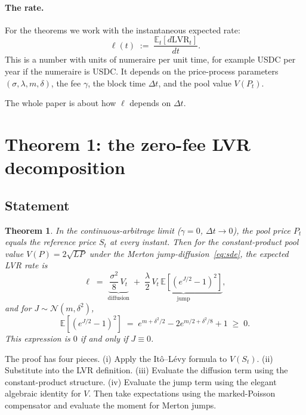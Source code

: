 \documentclass[11pt]{article}
\newtheorem{theorem}{Theorem}
\theoremstyle{definition}
\theoremstyle{remark}
\newcommand{\E}{\mathbb{E}}
\newcommand{\dt}{\Delta t}
\newcommand{\1}{\mathbf{1}}
\begin{document}
\paragraph{The rate.}
For the theorems we work with the instantaneous expected rate:
\begin{equation}\label{eq:rate}
\ell(t) \;:=\; \frac{\E_t[d\mathrm{LVR}_t]}{dt}.
\end{equation}
This is a number with units of numeraire per unit time, for example USDC per year if the numeraire is USDC. It depends on the price-process parameters $(\sigma, \lambda, m, \delta)$, the fee $\gamma$, the block time $\dt$, and the pool value $V(P_t)$.

The whole paper is about how $\ell$ depends on $\dt$.

\section{Theorem 1: the zero-fee LVR decomposition}\label{sec:thm1}

\subsection{Statement}

\begin{theorem}\label{thm:1}
In the continuous-arbitrage limit ($\gamma = 0$, $\dt \to 0$), the pool price $P_t$ equals the reference price $S_t$ at every instant. Then for the constant-product pool value $V(P) = 2\sqrt{LP}$ under the Merton jump-diffusion~\eqref{eq:sde}, the expected LVR rate is
\begin{equation}\label{eq:thm1}
\ell \;=\; \underbrace{\frac{\sigma^2}{8}\,V_t}_{\text{diffusion}} \;+\; \underbrace{\frac{\lambda}{2}\,V_t\,\E\!\left[(e^{J/2} - 1)^2\right]}_{\text{jump}},
\end{equation}
and for $J \sim \mathcal{N}(m, \delta^2)$,
\begin{equation}\label{eq:moment}
\E\!\left[(e^{J/2} - 1)^2\right] \;=\; e^{m + \delta^2/2} - 2 e^{m/2 + \delta^2/8} + 1 \;\ge\; 0.
\end{equation}
This expression is $0$ if and only if $J \equiv 0$.
\end{theorem}

The proof has four pieces. (i) Apply the Itô–Lévy formula to $V(S_t)$. (ii) Substitute into the LVR definition. (iii) Evaluate the diffusion term using the constant-product structure. (iv) Evaluate the jump term using the elegant algebraic identity for $V$. Then take expectations using the marked-Poisson compensator and evaluate the moment for Merton jumps.
\end{document}
